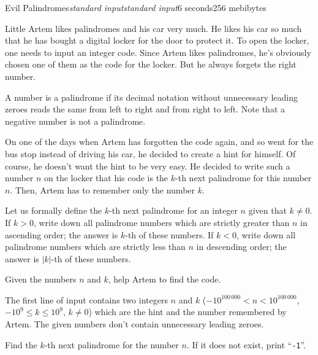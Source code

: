 \begin{problem}{Evil Palindromes}{\textsl{standard input}}{\textsl{standard input}}{6 seconds}{256 mebibytes}{}

Little Artem likes palindromes and his car very much. He likes his car so much that he has bought a digital locker for the door to protect it. To open the locker, one needs to input an integer code. Since Artem likes palindromes, he's obviously chosen one of them as the code for the locker. But he always forgets the right number.

A number is a palindrome if its decimal notation without unnecessary leading zeroes reads the same from left to right and from right to left. Note that a negative number is not a palindrome.

On one of the days when Artem has forgotten the code again, and so went for the bus stop instead of driving his car, he decided to create a hint for himself. Of course, he doesn't want the hint to be very easy. He decided to write such a number $n$ on the locker that his code is the $k$-th next palindrome for this number $n$. Then, Artem has to remember only the number $k$.

Let us formally define the $k$-th next palindrome for an integer $n$ given that $k \ne 0$. If $k > 0$, write down all palindrome numbers which are strictly greater than $n$ in ascending order; the answer is $k$-th of these numbers. If $k < 0$, write down all palindrome numbers which are strictly less than $n$ in descending order; the answer is $|k|$-th of these numbers.

Given the numbers $n$ and $k$, help Artem to find the code.

\InputFile
The first line of input contains two integers $n$ and $k$ ($-10^{100\,000} < n < 10^{100\,000}$, $-10^9 \le k \le 10^9$, $k \ne 0$) which are the hint and the number remembered by Artem. The given numbers don't contain unnecessary leading zeroes. 

\OutputFile
Find the $k$-th next palindrome for the number $n$. If it does not exist, print ``\texttt{-1}''.

\Examples

\begin{example}
%
%
%
%
\end{example}

\end{problem}

